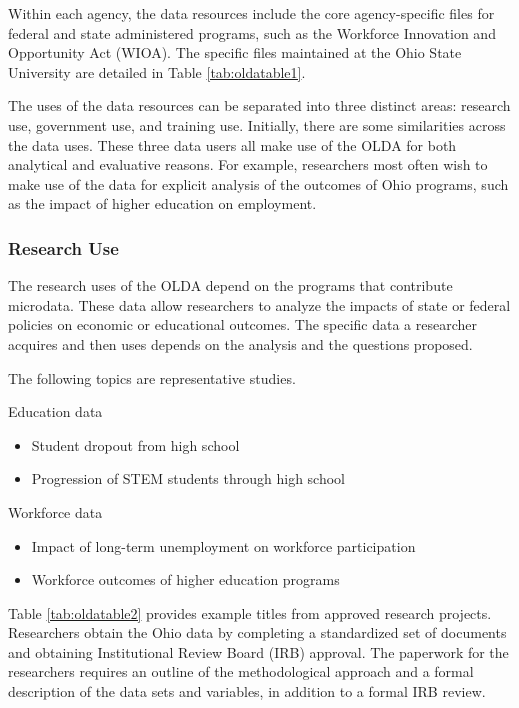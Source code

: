 Within each agency, the data resources include the core agency-specific files for federal and state administered programs, such as the Workforce Innovation and Opportunity Act (WIOA). The specific files maintained at the Ohio State University are detailed in Table \ref{tab:oldatable1}.



The uses of the data resources can be separated into three distinct areas: research use, government use, and training use. Initially, there are some similarities across the data uses. These three data users all make use of the OLDA for both analytical and evaluative reasons. For example, researchers most often wish to make use of the data for explicit analysis of the outcomes of Ohio programs, such as the impact of higher education on employment.

\hypertarget{research-use}{%
\subsubsection*{Research Use}\label{research-use}}

The research uses of the OLDA depend on the programs that contribute microdata. These data allow researchers to analyze the impacts of state or federal policies on economic or educational outcomes. The specific data a researcher acquires and then uses depends on the analysis and the questions proposed.

The following topics are representative studies.

Education data
\begin{itemize}
    \item Student dropout from high school
    \item Progression of STEM students through high school
\end{itemize}

Workforce data
\begin{itemize}
    \item Impact of long-term unemployment on workforce participation
    \item Workforce outcomes of higher education programs
\end{itemize}

Table \ref{tab:oldatable2} provides example titles from approved research projects. Researchers obtain the Ohio data by completing a standardized set of documents and obtaining Institutional Review Board (IRB) approval. The paperwork for the researchers requires an outline of the methodological approach and a formal description of the data sets and variables, in addition to a formal IRB review.

